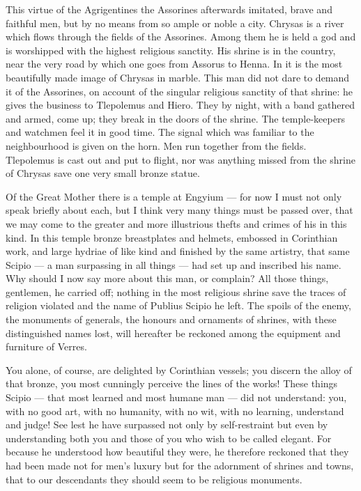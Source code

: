  This virtue of the Agrigentines the Assorines afterwards imitated, brave and faithful men, but by no means from so ample or noble a city. Chrysas is a river which flows through the fields of the Assorines. Among them he is held a god and is worshipped with the highest religious sanctity. His shrine is in the country, near the very road by which one goes from Assorus to Henna. In it is the most beautifully made image of Chrysas in marble. This man did not dare to demand it of the Assorines, on account of the singular religious sanctity of that shrine: he gives the business to Tlepolemus and Hiero. They by night, with a band gathered and armed, come up; they break in the doors of the shrine. The temple-keepers and watchmen feel it in good time. The signal which was familiar to the neighbourhood is given on the horn. Men run together from the fields. Tlepolemus is cast out and put to flight, nor was anything missed from the shrine of Chrysas save one very small bronze statue.

 Of the Great Mother there is a temple at Engyium --- for now I must not only speak briefly about each, but I think very many things must be passed over, that we may come to the greater and more illustrious thefts and crimes of his in this kind. In this temple bronze breastplates and helmets, embossed in Corinthian work, and large hydriae of like kind and finished by the same artistry, that same Scipio --- a man surpassing in all things --- had set up and inscribed his name. Why should I now say more about this man, or complain? All those things, gentlemen, he carried off; nothing in the most religious shrine save the traces of religion violated and the name of Publius Scipio he left. The spoils of the enemy, the monuments of generals, the honours and ornaments of shrines, with these distinguished names lost, will hereafter be reckoned among the equipment and furniture of Verres.

 You alone, of course, are delighted by Corinthian vessels; you discern the alloy of that bronze, you most cunningly perceive the lines of the works! These things Scipio --- that most learned and most humane man --- did not understand: you, with no good art, with no humanity, with no wit, with no learning, understand and judge! See lest he have surpassed not only by self-restraint but even by understanding both you and those of you who wish to be called elegant. For because he understood how beautiful they were, he therefore reckoned that they had been made not for men's luxury but for the adornment of shrines and towns, that to our descendants they should seem to be religious monuments.

